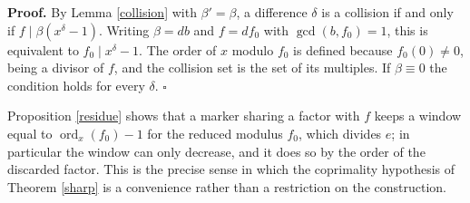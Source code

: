 \documentclass[11pt,reqno]{amsart}
\theoremstyle{definition}
\theoremstyle{remark}
\newcommand{\ord}{\operatorname{ord}}
\begin{document}
\textbf{Proof.} By Lemma \ref{collision} with $\beta'=\beta$, a difference $\delta$ is a collision if and only if $f\mid\beta(x^\delta-1)$. Writing $\beta=d b$ and $f=d f_0$ with $\gcd(b,f_0)=1$, this is equivalent to $f_0\mid x^\delta-1$. The order of $x$ modulo $f_0$ is defined because $f_0(0)\neq0$, being a divisor of $f$, and the collision set is the set of its multiples. If $\beta\equiv0$ the condition holds for every $\delta$. $\square$


Proposition \ref{residue} shows that a marker sharing a factor with $f$ keeps a window equal to $\ord_x(f_0)-1$ for the reduced modulus $f_0$, which divides $e$; in particular the window can only decrease, and it does so by the order of the discarded factor. This is the precise sense in which the coprimality hypothesis of Theorem \ref{sharp} is a convenience rather than a restriction on the construction.





\end{document}
